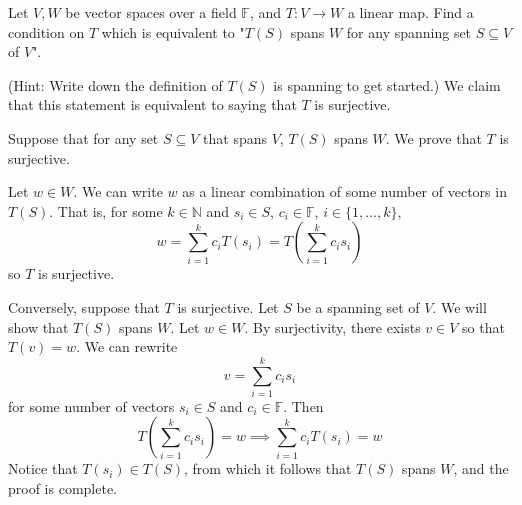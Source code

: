 \documentclass{eh-homework}
\begin{document}
    \begin{question}{7}
        Let \( V, W \) be vector spaces over a field \( \mathbb{F} \), and \( T : V \to W \) a linear map. Find a condition on \( T \) which is equivalent to "\( T(S) \) spans \( W \) for any spanning set \( S \subseteq V \) of \( V \)".

        (Hint: Write down the definition of \( T(S) \) is spanning to get started.)
        \tcblower
        We claim that this statement is equivalent to saying that \(T\) is surjective.

        Suppose that for any set \(S \subseteq V\) that spans \(V\), \(T(S)\) spans \(W\). We prove that \(T\) is surjective.

        Let \(w \in W\). We can write \(w\) as a linear combination of some number of vectors in \(T(S)\). That is, for some \(k \in \mathbb{N}\) and \(s_i \in S\), \(c_i \in \mathbb{F}\), \(i \in \{ 1, ..., k \}\),
        \[
            w = \sum_{i=1}^{k} c_i T(s_i) = T \left(\sum_{i=1}^{k}c_i s_i\right)
        \]
        so \(T\) is surjective.

        Conversely, suppose that \(T\) is surjective. Let \(S\) be a spanning set of \(V\). We will show that \(T(S)\) spans \(W\). Let \(w \in W\). By surjectivity, there exists \(v \in V\) so that \(T(v) = w\). We can rewrite
        \[
            v = \sum_{i=1}^{k} c_i s_i
        \]
        for some number of vectors \(s_i \in S\) and \(c_i \in \mathbb{F}\). Then
        \[
            T\left( \sum_{i=1}^{k} c_i s_i \right) = w \implies \sum_{i=1}^{k} c_i T(s_i) = w
        \]
        Notice that \(T(s_i) \in T(S)\), from which it follows that \(T(S)\) spans \(W\), and the proof is complete.
    \end{question}
\end{document}
